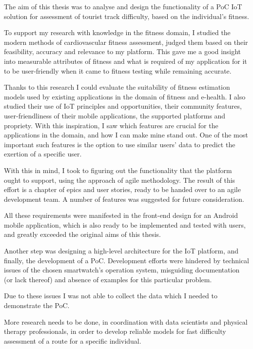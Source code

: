 The aim of this thesis was to analyse and design the functionality of a PoC IoT solution for assessment of tourist track difficulty, based on the individual's fitness.

To support my research with knowledge in the fitness domain, I studied the modern methods of cardiovascular fitness assessment, judged them based on their feasibility, accuracy and relevance to my platform.
This gave me a good insight into measurable attributes of fitness and what is required of my application for it to be user-friendly when it came to fitness testing while remaining accurate.

Thanks to this research I could evaluate the suitability of fitness estimation models used by existing applications in the domain of fitness and e-health.
I also studied their use of IoT principles and opportunities, their community features, user-friendliness of their mobile applications, the supported platforms and propriety.
With this inspiration, I saw which features are crucial for the applications in the domain, and how I can make mine stand out.
One of the most important such features is the option to use similar users' data to predict the exertion of a specific user.

With this in mind, I took to figuring out the functionality that the platform ought to support, using the approach of agile methodology.
The result of this effort is a chapter of epics and user stories, ready to be handed over to an agile development team.
A number of features was suggested for future consideration.

All these requirements were manifested in the front-end design for an Android mobile application, which is also ready to be implemented and tested with users, and greatly exceeded the original aims of this thesis.

Another step was designing a high-level architecture for the IoT platform, and finally, the development of a PoC.
Development efforts were hindered by technical issues of the chosen smartwatch's operation system, misguiding documentation (or lack thereof) and absence of examples for this particular problem.

Due to these issues I was not able to collect the data which I needed to demonstrate the PoC.

More research needs to be done, in coordination with data scientists and physical therapy professionals, in order to develop reliable models for fast difficulty assessment of a route for a specific individual.